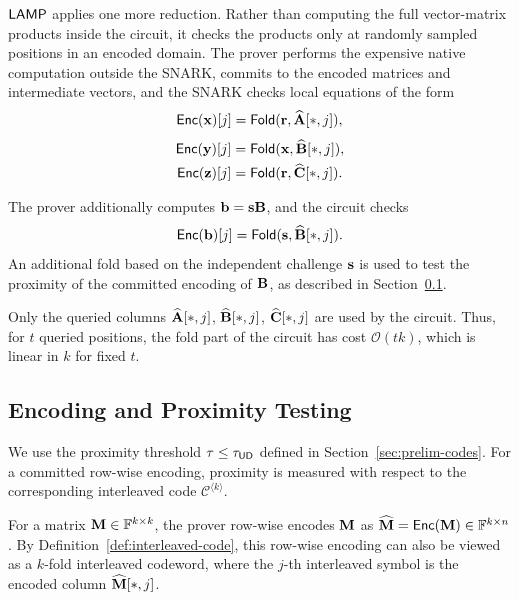 \(\textsf{LAMP}\) applies one more reduction.  Rather than computing the full
vector-matrix products inside the circuit, it checks the products only at
randomly sampled positions in an encoded domain.  The prover performs the
expensive native computation outside the SNARK, commits to the encoded
matrices and intermediate vectors, and the SNARK checks local equations of the
form
\[
  \mathsf{Enc}(\mathbf{x})[j]
  =
  \textsf{Fold}(\mathbf{r},\widehat{\mathbf{A}}[*,j]),
\]
\[
\begin{aligned}
  \mathsf{Enc}(\mathbf{y})[j]
  &=
  \textsf{Fold}(\mathbf{x},\widehat{\mathbf{B}}[*,j]),\\
  \mathsf{Enc}(\mathbf{z})[j]
  &=
  \textsf{Fold}(\mathbf{r},\widehat{\mathbf{C}}[*,j]).
\end{aligned}
\]
\begin{revblock}
  The prover additionally computes $\mathbf{b} = \mathbf{s}\mathbf{B}$, and the circuit checks
  \[
    \mathsf{Enc}(\mathbf{b})[j] = \textsf{Fold}(\mathbf{s},\widehat{\mathbf{B}}[*,j]).
  \]
  An additional fold based on the independent challenge $\mathbf{s}$ is used
to test the proximity of the committed encoding of $\mathbf{B}$, as described
in Section~\ref{sec:overview-encoding}.
\end{revblock}
Only the queried columns
\(\widehat{\mathbf{A}}[*,j]\), \(\widehat{\mathbf{B}}[*,j]\),
\(\widehat{\mathbf{C}}[*,j]\) are used by the circuit.  Thus, for \(t\) queried
positions, the fold part of the circuit has cost \(\mathcal{O}(tk)\), which is
linear in \(k\) for fixed \(t\).

\subsection{Encoding and Proximity Testing}
\label{sec:overview-encoding}
\begin{revblock}
We use the proximity threshold $\tau \leq \tau_{{\mathsf{UD}}}$ defined in
Section~\ref{sec:prelim-codes}. For a committed row-wise encoding, proximity
is measured with respect to the corresponding interleaved code
$\mathcal{C}^{\langle k\rangle}$.
\end{revblock}

For a matrix $\mathbf{M}\in\mathbb{F}^{k\times k}$, the prover row-wise encodes
$\mathbf{M}$ as
$\widehat{\mathbf{M}}=\mathsf{Enc}(\mathbf{M})\in\mathbb{F}^{k\times n}$.
By Definition~\ref{def:interleaved-code}, this row-wise encoding can also be
viewed as a $k$-fold interleaved codeword, where the $j$-th interleaved
symbol is the encoded column $\widehat{\mathbf{M}}[*,j]$.


